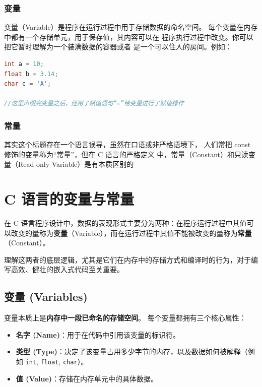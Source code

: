 \subsubsection{变量}

变量（Variable）是程序在运行过程中用于存储数据的命名空间。
每个变量在内存中都有一个存储单元，用于保存值，其内容可以在
程序执行过程中改变。你可以把它暂时理解为一个装满数据的容器或者
是一个可以住人的房间。例如：

\begin{lstlisting}[language=C,caption={变量声明示例},label={lst:variables}]
int a = 10;
float b = 3.14;
char c = 'A';

//这里声明完变量之后，还用了赋值语句“=”给变量进行了赋值操作

\end{lstlisting}
\vspace{1em}%

\subsubsection{常量}
其实这个标题存在一个语言误导，虽然在口语或非严格语境下，
人们常把 const 修饰的变量称为“常量”，但在 C 语言的严格定义
中，常量（Constant）和只读变量（Read-only Variable）是有本质区别的




\section{C 语言的变量与常量}

在 C 语言程序设计中，数据的表现形式主要分为两种：在程序运行过程中其值可以改变的量称为\textbf{变量}（Variable），而在运行过程中其值不能被改变的量称为\textbf{常量}（Constant）。

理解这两者的底层逻辑，尤其是它们在内存中的存储方式和编译时的行为，对于编写高效、健壮的嵌入式代码至关重要。

\subsection{变量 (Variables)}

变量本质上是\textbf{内存中一段已命名的存储空间}。
每个变量都拥有三个核心属性：
\begin{itemize}
    \item \textbf{名字 (Name)}：用于在代码中引用该变量的标识符。
    \item \textbf{类型 (Type)}：决定了该变量占用多少字节的内存，以及数据如何被解释（例如 \texttt{int}, \texttt{float}, \texttt{char}）。
    \item \textbf{值 (Value)}：存储在内存单元中的具体数据。
\end{itemize}

